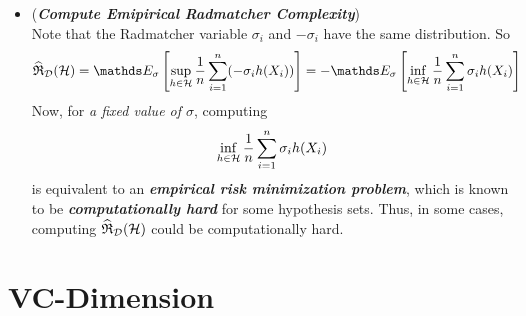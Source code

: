 \documentclass[11pt]{article}
\begin{document}
\begin{itemize}
\item \begin{remark} (\emph{\textbf{Compute Emipirical Radmatcher Complexity}})\\
Note that the Radmatcher variable $\sigma_i$ and $-\sigma_i$ have the same distribution. So
\begin{align*}
\widehat{\frR}_{\cD}(\cH)&= \E{\sigma}{\sup_{h \in \cH}\frac{1}{n}\sum_{i=1}^{n}(-\sigma_{i}h(X_i))} = -\E{\sigma}{\inf_{h \in \cH}\frac{1}{n}\sum_{i=1}^{n}\sigma_{i}h(X_i)}
\end{align*} Now, for \emph{a fixed value of $\sigma$}, computing 
\begin{align*}
\inf_{h \in {\mathcal H}}\frac{1}{n}\sum_{i=1}^{n}\sigma_{i}h(X_i)
\end{align*} is equivalent to an \emph{\textbf{empirical risk minimization problem}}, which is known to be \emph{\textbf{computationally hard}} for some hypothesis sets. Thus, in some cases, computing $\widehat{{\mathfrak R}}_{{\mathcal D}}({\mathcal H})$ could be computationally hard. 
\end{remark}
\end{itemize}

\section{VC-Dimension}
\end{document}
